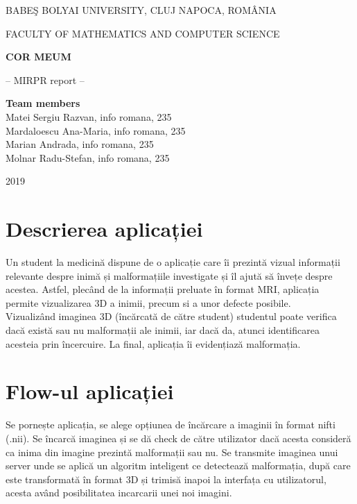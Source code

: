 \documentclass[a4papaer,12pt]{article}
\begin{document}
\begin{titlepage}
\sloppy
\begin{center}
BABE\c S BOLYAI UNIVERSITY, CLUJ NAPOCA, ROM\^ ANIA

FACULTY OF MATHEMATICS AND COMPUTER SCIENCE

\vspace{6cm}

\Huge \textbf{COR MEUM}

\vspace{1cm}

\normalsize -- MIRPR report --

\end{center}


\vspace{2cm}

\begin{flushright}
\Large{\textbf{Team members}}\\
Matei Sergiu Razvan, info romana, 235\\
Mardaloescu Ana-Maria, info romana, 235\\
Marian Andrada, info romana, 235\\
Molnar Radu-Stefan, info romana, 235
\end{flushright}

\vspace{2cm}

\begin{center}
2019
\end{center}

\end{titlepage}


\section{Descrierea aplicației}
Un student la medicină dispune de o aplicație care îi prezintă vizual informații relevante despre inimă și malformațiile investigate și îl ajută să învețe despre acestea. Astfel, plecând de la informații preluate în format MRI, aplicația permite vizualizarea 3D a inimii, precum si a unor defecte posibile. 
\\
\indent Vizualizând imaginea 3D (încărcată de către student) studentul poate verifica dacă există sau nu malformații ale inimii, iar dacă da, atunci identificarea acesteia prin încercuire. La final, aplicația îi evidențiază malformația.

\section{Flow-ul aplicației}
Se pornește aplicația, se alege opțiunea de încărcare a imaginii în format nifti (.nii). Se încarcă imaginea și se dă check de către utilizator dacă acesta consideră ca inima din imagine prezintă malformații sau nu. Se transmite imaginea unui server unde se aplică un algoritm inteligent ce detectează malformația, după care este transformată în format 3D și trimisă inapoi la interfața cu utilizatorul, acesta având posibilitatea incarcarii unei noi imagini.
\end{document}
